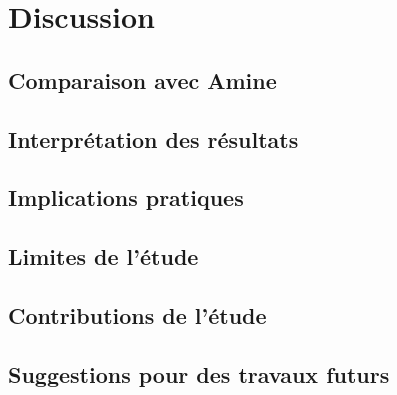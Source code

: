 \chapter{ Discussion}

\section{Comparaison avec Amine}
\section{Interprétation des résultats}
\section{Implications pratiques} 
\section{Limites de l'étude}
\section{Contributions de l'étude}
\section{Suggestions pour des travaux futurs}
